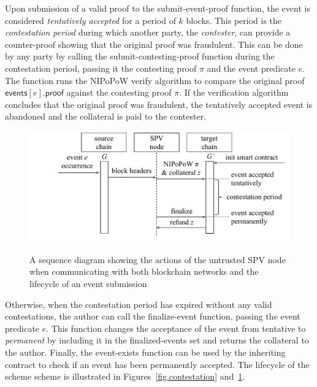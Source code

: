 Upon submission of a valid proof to the \textsf{submit-event-proof} function,
the event is considered \emph{tentatively accepted} for a period of $k$ blocks.
This period is the \emph{contestation period} during which another party, the
\emph{contester}, can provide a counter-proof showing that the original proof
was fraudulent. This can be done by any party by calling the
\textsf{submit-contesting-proof} function during the contestation period,
passing it the contesting proof $\pi$ and the event predicate $e$. The function
runs the NIPoPoW \textsf{verify} algorithm to compare the original proof
$\textsf{events}[e].\textsf{proof}$ against the contesting proof $\pi$. If the
verification algorithm concludes that the original proof was fraudulent, the
tentatively accepted event is abandoned and the collateral is paid to the
contester.

\begin{figure}[H]
    \caption{A sequence diagram showing the actions of the untrusted SPV node
             when communicating with both blockchain networks and the lifecycle
             of an event submission}
    \centering
    \includegraphics[width=0.85 \columnwidth,keepaspectratio]{figures/sequence-diagram.pdf}
    \label{fig.sequence}
\end{figure}

Otherwise, when the contestation period has expired without any valid
contestations, the author can call the \textsf{finalize-event} function, passing
the event predicate $e$. This function changes the acceptance of the event from
tentative to \emph{permanent} by including it in the \textsf{finalized-events}
set and returns the collateral to the author. Finally, the \textsf{event-exists}
function can be used by the inheriting contract to check if an event has been
permanently accepted. The lifecycle of the scheme scheme is illustrated in
Figures~\ref{fig.contestation} and~\ref{fig.sequence}.


